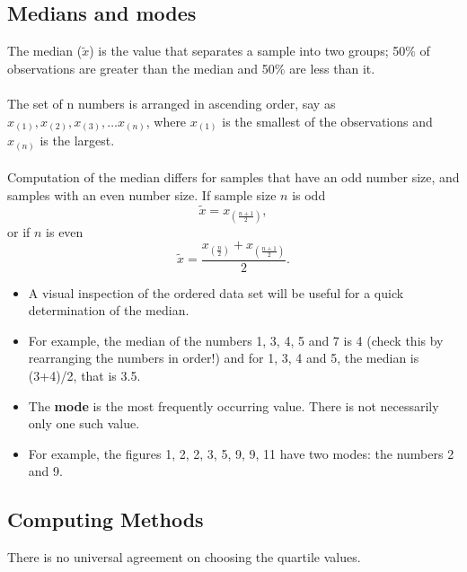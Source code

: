 \documentclass[]{report}
\begin{document}



\subsection{Medians and modes}
The median ($\tilde{x}$) is the value that separates a sample into two groups; 50\% of observations are greater
than the median and 50\% are less than it.
\\ \\\noindent The set of n numbers is arranged in ascending order, say as $x_(1), x_(2), x_(3), \dots x_(n)$, where $x_(1)$ is the smallest of the observations and $x_(n)$ is the largest.
\\ \\\noindent Computation of the median differs for samples that have an odd number size, and samples with an even number size. If sample size $n$ is odd
\[ \tilde{x} =  x_{(\frac{n+1}{2})} ,\]
or if $n$ is even 
\[ \tilde{x} =  \frac{  x_{(\frac{n}{2})}  + x_{(\frac{n+1}{2})} }{2}. \]



\begin{itemize}
\item A visual inspection of the ordered data set will be useful for a quick determination of the median.
\item For example, the median of the numbers 1, 3, 4, 5 and 7 is 4 (check this by
rearranging the numbers in order!) and for 1, 3, 4 and 5, the median is (3+4)/2, that is
3.5.
\item The \textbf{mode} is the most frequently occurring value. There is not necessarily only one
such value. 
\item For example, the figures 1, 2, 2, 3, 5, 9, 9, 11 have two modes: the
numbers 2 and 9.
\end{itemize}















\subsection*{Computing Methods}

There is no universal agreement on choosing the quartile values.
\end{document}
